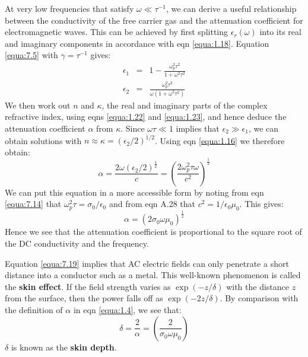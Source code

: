 \documentclass[12pt]{book}
\begin{document}
At very low frequencies that satisfy $\omega\ll\tau^{-1}$, we can derive a useful relationship between the conductivity of the free carrier gas and the attenuation coefficient for electromagnetic waves. This can be achieved by first splitting $\epsilon_r(\omega)$ into its real and imaginary components in accordance with eqn \ref{equa:1.18}. Equation \ref{equa:7.5} with $\gamma=\tau^{-1}$ gives:
\begin{eqnarray}
  \epsilon_1 &=& 1-\frac{\omega_p^2\tau^2}{1+\omega^2\tau^2} \label{equa:7.16} \\
  \epsilon_2 &=& \frac{\omega_p^2\tau^2}{\omega(1+\omega^2\tau^2)} \label{equa:7.17}
\end{eqnarray}
We then work out $n$ and $\kappa$, the real and imaginary parts of the complex refractive index, using eqns \ref{equa:1.22} and \ref{equa:1.23}, and hence deduce the attenuation coefficient $\alpha$ from $\kappa$. Since $\omega\tau\ll 1$ implies that $\epsilon_2\gg\epsilon_1$, we can obtain solutions with $n\approx\kappa=(\epsilon_2/2)^{1/2}$. Using eqn \ref{equa:1.16} we therefore obtain:
\begin{equation}\label{equa:7.18}
  \alpha=\frac{2\omega(\epsilon_2/2)^{\frac{1}{2}}}{c}=\left(\frac{2\omega_p^2\tau\omega}{c^2}\right)^{\frac{1}{2}}
\end{equation}
We can put this equation in a more accessible form by noting from eqn \ref{equa:7.14} that $\omega_p^2\tau=\sigma_0/\epsilon_0$ and from eqn A.28 that $c^2=1/{\epsilon_0\mu_0}$. This gives:
\begin{equation}\label{equa:7.19}
  \alpha=(2\sigma_0\omega\mu_0)^{\frac{1}{2}}
\end{equation}
Hence we see that the attenuation coefficient is proportional to the square root of the DC conductivity and the frequency.

Equation \ref{equa:7.19} implies that AC electric fields can only penetrate a short distance into a conductor such as a metal. This well-known phenomenon is called the \textbf{skin effect}. If the field strength varies as $\exp(-z/\delta)$ with the distance $z$ from the surface, then the power falls off as $\exp(-2z/\delta)$. By comparison with the definition of $\alpha$ in eqn \ref{equa:1.4}, we see that:
\begin{equation}\label{equa:7.20}
  \delta=\frac{2}{\alpha}=(\frac{2}{\sigma_0\omega\mu_0})
\end{equation}
$\delta$ is known as the \textbf{skin depth}.
\end{document}
